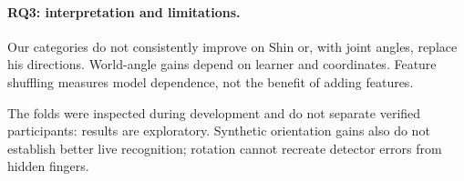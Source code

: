 \paragraph{RQ3: interpretation and limitations.}
Our categories do not consistently improve on Shin or, with joint angles, replace his directions. World-angle gains depend on learner and coordinates. Feature shuffling measures model dependence, not the benefit of adding features.

The folds were inspected during development and do not separate verified participants: results are exploratory. Synthetic orientation gains also do not establish better live recognition; rotation cannot recreate detector errors from hidden fingers.
